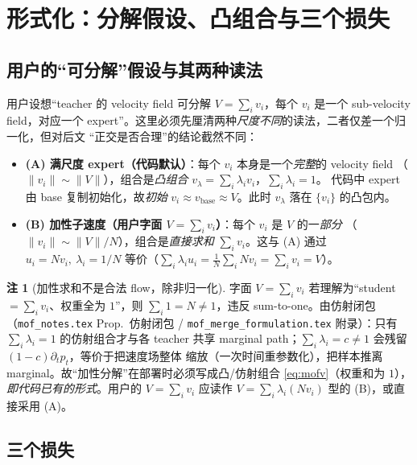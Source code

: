 \documentclass[11pt,a4paper]{article}
\newcommand{\base}{\mathrm{base}}
\newcommand{\vbase}{v_{\base}}
\theoremstyle{definition}
\newtheorem{remark}{注}
\begin{document}
\section{形式化：分解假设、凸组合与三个损失}
\label{sec:formal}

\subsection{用户的``可分解''假设与其两种读法}
\label{ssec:decomp}

用户设想``teacher 的 velocity field 可分解 $V=\sum_i v_i$，每个 $v_i$ 是一个 sub-velocity
field，对应一个 expert''。这里必须先厘清两种\emph{尺度不同}的读法，二者仅差一个归一化，但对后文
``正交是否合理''的结论截然不同：

\begin{itemize}[leftmargin=1.5em]
\item \textbf{(A) 满尺度 expert（代码默认）}：每个 $v_i$ 本身是一个\emph{完整}的 velocity field
（$\|v_i\|\sim\|V\|$），组合是\emph{凸组合} $v_\lambda=\sum_i\lambda_i v_i$，$\sum_i\lambda_i=1$。
代码中 expert 由 base 复制初始化，故\emph{初始} $v_i\approx\vbase\approx V$。此时 $v_\lambda$ 落在
$\{v_i\}$ 的凸包内。
\item \textbf{(B) 加性子速度（用户字面 $V=\sum_i v_i$）}：每个 $v_i$ 是 $V$ 的一\emph{部分}
（$\|v_i\|\sim\|V\|/N$），组合是\emph{直接求和} $\sum_i v_i$。这与 (A) 通过 $u_i=N v_i,\
\lambda_i=1/N$ 等价（$\sum_i\lambda_i u_i=\frac1N\sum_i N v_i=\sum_i v_i=V$）。
\end{itemize}

\begin{remark}[加性求和不是合法 flow，除非归一化]
\label{rem:sumtoone}
字面 $V=\sum_i v_i$ 若理解为``student $=\sum_i v_i$、权重全为 $1$''，则 $\sum_i 1=N\neq1$，违反
sum-to-one。由仿射闭包（\texttt{mof\_notes.tex} Prop.\ 仿射闭包 /
\texttt{mof\_merge\_formulation.tex} 附录）：只有 $\sum_i\lambda_i=1$ 的仿射组合才与各 teacher
共享 marginal path；$\sum_i\lambda_i=c\neq1$ 会残留 $(1-c)\partial_t p_t$，等价于把速度场整体
缩放（一次时间重参数化），把样本推离 marginal。故``加性分解''在部署时必须写成凸/仿射组合
\eqref{eq:mofv}（权重和为 $1$），\emph{即代码已有的形式}。用户的 $V=\sum_i v_i$ 应读作
$V=\sum_i\lambda_i(N v_i)$ 型的 (B)，或直接采用 (A)。
\end{remark}

\subsection{三个损失}
\label{ssec:losses}
\end{document}
